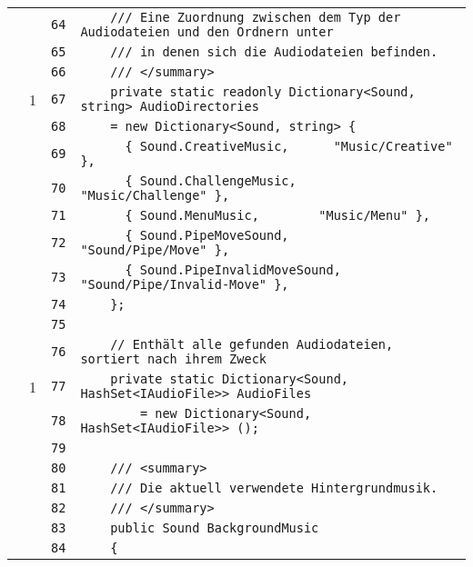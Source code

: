 \documentclass[a4paper,10pt]{article}
\begin{document}
\begin{longtable}[l]{lrrl}
\cellcolor{gray} &  & \verb~64~ & \verb~    /// Eine Zuordnung zwischen dem Typ der Audiodateien und den Ordnern unter~\\
\cellcolor{gray} &  & \verb~65~ & \verb~    /// in denen sich die Audiodateien befinden.~\\
\cellcolor{gray} &  & \verb~66~ & \verb~    /// </summary>~\\
\cellcolor{green} & 1 & \verb~67~ & \verb~    private static readonly Dictionary<Sound, string> AudioDirectories~\\
\cellcolor{gray} &  & \verb~68~ & \verb~    = new Dictionary<Sound, string> {~\\
\cellcolor{gray} &  & \verb~69~ & \verb~      { Sound.CreativeMusic,      "Music/Creative" },~\\
\cellcolor{gray} &  & \verb~70~ & \verb~      { Sound.ChallengeMusic,      "Music/Challenge" },~\\
\cellcolor{gray} &  & \verb~71~ & \verb~      { Sound.MenuMusic,        "Music/Menu" },~\\
\cellcolor{gray} &  & \verb~72~ & \verb~      { Sound.PipeMoveSound,      "Sound/Pipe/Move" },~\\
\cellcolor{gray} &  & \verb~73~ & \verb~      { Sound.PipeInvalidMoveSound,  "Sound/Pipe/Invalid-Move" },~\\
\cellcolor{gray} &  & \verb~74~ & \verb~    };~\\
\cellcolor{gray} &  & \verb~75~ & \verb~~\\
\cellcolor{gray} &  & \verb~76~ & \verb~    // Enthält alle gefunden Audiodateien, sortiert nach ihrem Zweck~\\
\cellcolor{green} & 1 & \verb~77~ & \verb~    private static Dictionary<Sound, HashSet<IAudioFile>> AudioFiles~\\
\cellcolor{gray} &  & \verb~78~ & \verb~        = new Dictionary<Sound, HashSet<IAudioFile>> ();~\\
\cellcolor{gray} &  & \verb~79~ & \verb~~\\
\cellcolor{gray} &  & \verb~80~ & \verb~    /// <summary>~\\
\cellcolor{gray} &  & \verb~81~ & \verb~    /// Die aktuell verwendete Hintergrundmusik.~\\
\cellcolor{gray} &  & \verb~82~ & \verb~    /// </summary>~\\
\cellcolor{gray} &  & \verb~83~ & \verb~    public Sound BackgroundMusic~\\
\cellcolor{gray} &  & \verb~84~ & \verb~    {~\\

\end{longtable}
\end{document}
